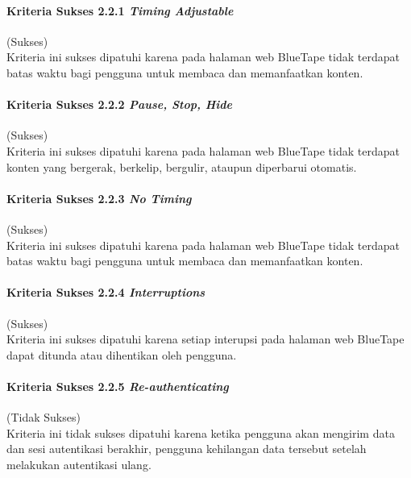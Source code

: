 \paragraph{Kriteria Sukses 2.2.1 \textit{Timing Adjustable}}
\label{par:kepatuhan_bluetape_kriteria_sukses_2.2.1}
(Sukses)\\

Kriteria ini sukses dipatuhi karena pada halaman web BlueTape tidak terdapat batas waktu bagi pengguna untuk membaca dan memanfaatkan konten.

\paragraph{Kriteria Sukses 2.2.2 \textit{Pause, Stop, Hide}}
\label{par:kepatuhan_bluetape_kriteria_sukses_2.2.2}
(Sukses)\\

Kriteria ini sukses dipatuhi karena pada halaman web BlueTape tidak terdapat konten yang bergerak, berkelip, bergulir, ataupun diperbarui otomatis.

\paragraph{Kriteria Sukses 2.2.3 \textit{No Timing}}
\label{par:kepatuhan_bluetape_kriteria_sukses_2.2.3}
(Sukses)\\

Kriteria ini sukses dipatuhi karena pada halaman web BlueTape tidak terdapat batas waktu bagi pengguna untuk membaca dan memanfaatkan konten.

\paragraph{Kriteria Sukses 2.2.4 \textit{Interruptions}}
\label{par:kepatuhan_bluetape_kriteria_sukses_2.2.4}
(Sukses)\\

Kriteria ini sukses dipatuhi karena setiap interupsi pada halaman web BlueTape dapat ditunda atau dihentikan oleh pengguna.

\paragraph{Kriteria Sukses 2.2.5 \textit{Re-authenticating}}
\label{par:kepatuhan_bluetape_kriteria_sukses_2.2.5}
(Tidak Sukses)\\

Kriteria ini tidak sukses dipatuhi karena ketika pengguna akan mengirim data dan sesi autentikasi berakhir, pengguna kehilangan data tersebut setelah melakukan autentikasi ulang.

